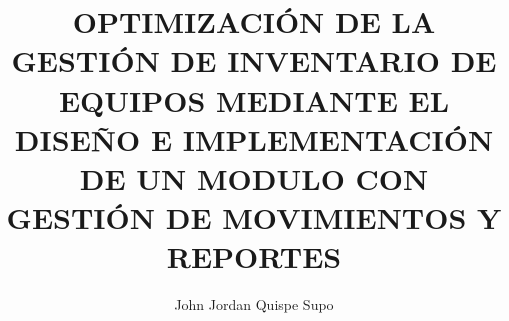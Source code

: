 \documentclass[stu, 12pt, letterpaper, donotrepeattitle, floatsintext, natbib]{apa7}
\title{OPTIMIZACI\'ON DE LA GESTI\'ON DE INVENTARIO DE EQUIPOS MEDIANTE EL DISE\~{N}O E IMPLEMENTACI\'ON DE UN MODULO CON GESTI\'ON DE MOVIMIENTOS Y REPORTES}
\author{John Jordan Quispe Supo}
\begin{document}
\maketitle
\renewcommand\refname{\textbf{Bibliograf\'{\i}a}}
\renewcommand\contentsname{\'Indice}
\tableofcontents
\setcounter{tocdepth}{2}
\newpage
\renewcommand\listfigurename{\'Indice de Figuras}
\listoffigures
\newpage
\renewcommand\listtablename{\'Indice de Tablas}
\listoftables
\newpage
\renewcommand\lstlistlistingname{\'Indice de C\'odigos}
\renewcommand\lstlistingname{C\'odigo}
\lstlistoflistings\newpage




\end{document}
